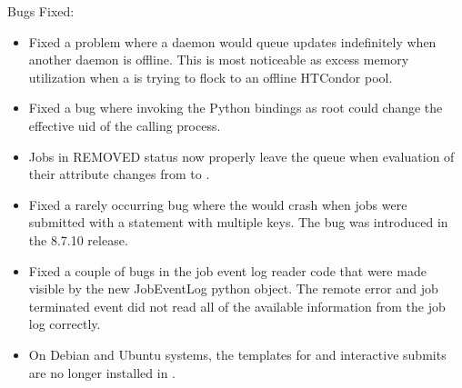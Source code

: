 \noindent Bugs Fixed:

\begin{itemize}

\item Fixed a problem where a daemon would queue updates indefinitely when another
daemon is offline.
This is most noticeable as excess memory utilization when a  is
trying to flock to an offline HTCondor pool.

\item Fixed a bug where invoking the Python bindings as root could change
the effective uid of the calling process.

\item Jobs in REMOVED status now properly leave the queue when
evaluation of their  attribute changes from
 to .

\item Fixed a rarely occurring bug where the  would crash when
jobs were submitted with a  statement with multiple keys.
The bug was introduced in the 8.7.10 release.

\item Fixed a couple of bugs in the job event log reader code that were made visible by
the new JobEventLog python object. The remote error and job terminated event did not read
all of the available information from the job log correctly. 

\item On Debian and Ubuntu systems, the templates for  and
interactive submits are no longer installed in .

\end{itemize}

